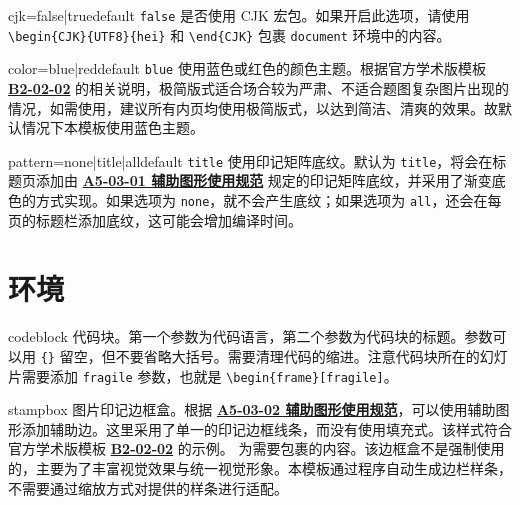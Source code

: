 \documentclass[a4paper,12pt]{article}
\begin{document}
\begin{CJK}{UTF8}{song}
\begin{docKey*}[SJTUBeamer]{cjk}{=false|true}{default \texttt{false}}
    是否使用 \textsf{CJK} 宏包。如果开启此选项，请使用 \verb"\begin{CJK}{UTF8}{hei}" 和 \verb"\end{CJK}" 包裹 \verb"document" 环境中的内容。
\end{docKey*}

\begin{docKey*}[SJTUBeamer]{color}{=blue|red}{default \texttt{blue}}
    使用蓝色或红色的颜色主题。根据官方学术版模板 \href{http://vi.sjtu.edu.cn/index.php/articles/app/8}{\textbf{B2-02-02}} 的相关说明，极简版式适合场合较为严肃、不适合题图复杂图片出现的情况，如需使用，建议所有内页均使用极简版式，以达到简洁、清爽的效果。故默认情况下本模板使用蓝色主题。
\end{docKey*}

\begin{docKey*}[SJTUBeamer]{pattern}{=none|title|all}{default \texttt{title}}
    使用印记矩阵底纹。默认为 \verb"title"，将会在标题页添加由 \href{http://vi.sjtu.edu.cn/index.php/articles/base/5}{\textbf{A5-03-01 辅助图形使用规范}} 规定的印记矩阵底纹，并采用了渐变底色的方式实现。如果选项为 \verb"none"，就不会产生底纹；如果选项为 \verb"all"，还会在每页的标题栏添加底纹，这可能会增加编译时间。
\end{docKey*}

\section{环境}

\begin{docEnvironment*}[doc parameter=\marg{language}\marg{title}, doclang/environment content=code]{codeblock}{}
    代码块。第一个参数为代码语言，第二个参数为代码块的标题。参数可以用 \verb"{}" 留空，但不要省略大括号。需要清理代码的缩进。注意代码块所在的幻灯片需要添加 \verb"fragile" 参数，也就是 \verb"\begin{frame}[fragile]"。
\end{docEnvironment*}

\begin{docEnvironment*}[doclang/environment content=code]{stampbox}{}
    图片印记边框盒。根据 \href{http://vi.sjtu.edu.cn/index.php/articles/base/5}{\textbf{A5-03-02 辅助图形使用规范}}，可以使用辅助图形添加辅助边。这里采用了单一的印记边框线条，而没有使用填充式。该样式符合官方学术版模板 \href{http://vi.sjtu.edu.cn/index.php/articles/app/8}{\textbf{B2-02-02}} 的示例。 为需要包裹的内容。该边框盒不是强制使用的，主要为了丰富视觉效果与统一视觉形象。本模板通过程序自动生成边栏样条，不需要通过缩放方式对提供的样条进行适配。
\end{docEnvironment*}


\end{CJK}
\end{document}

